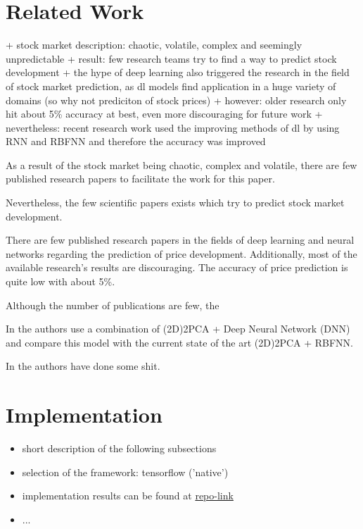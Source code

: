 \documentclass{IEEEtran}
\begin{document}
\section{Related Work}
\label{sec:relatedwork}
+ stock market description: chaotic, volatile, complex and seemingly unpredictable
+ result: few research teams try to find a way to predict stock development
+ the hype of deep learning also triggered the research in the field of stock market prediction, as dl models find application in a huge variety of domains (so why not prediciton of stock prices)
+ however: older research only hit about 5\% accuracy at best, even more discouraging for future work
+ nevertheless: recent research work used the improving methods of dl by using RNN and RBFNN and therefore the accuracy was improved 

As a result of the stock market being chaotic, complex and volatile, there are few published research papers to facilitate the work for this paper. 

Nevertheless, the few scientific papers exists which try to predict stock market development. 


There are few published research papers in the fields of deep learning and neural networks regarding the prediction of price development. 
Additionally, most of the available research's results are discouraging. The accuracy of price prediction is quite low with about 5\%. 

Although the number of publications are few, the

In \cite{stockprediction01} the authors use a combination of (2D)2PCA + Deep Neural Network (DNN) and compare this model with the current state of the art (2D)2PCA + RBFNN. 

In \cite{stockprediction02} the authors have done some shit. 

\section{Implementation}
\label{sec:implementation}

\begin{itemize}
	\item short description of the following subsections
	\item selection of the framework: tensorflow ('native')
	\item implementation results can be found at \url{repo-link}
	\item ...
\end{itemize}
\end{document}
